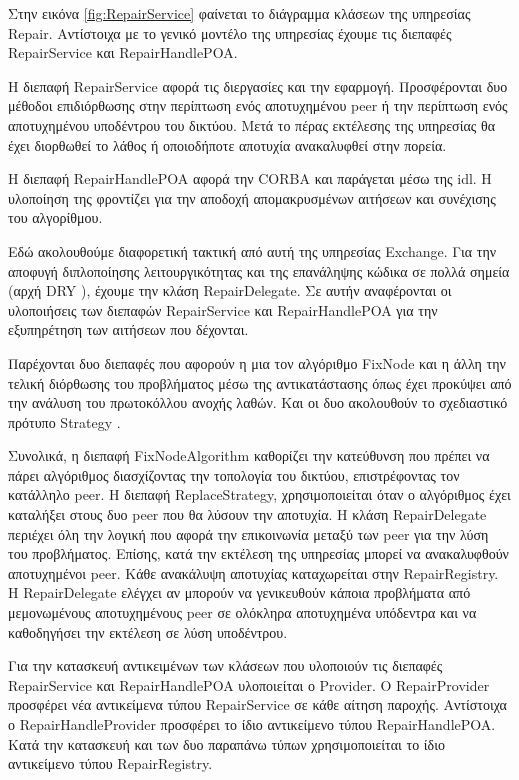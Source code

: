 Στην εικόνα \ref{fig:RepairService} φαίνεται το διάγραμμα κλάσεων της υπηρεσίας 
Repair. Αντίστοιχα με το γενικό μοντέλο της υπηρεσίας έχουμε τις 
διεπαφές RepairService και RepairHandlePOA. 

Η διεπαφή RepairService αφορά τις διεργασίες και την εφαρμογή. 
Προσφέρονται δυο μέθοδοι επιδιόρθωσης στην περίπτωση ενός αποτυχημένου 
peer ή την περίπτωση ενός αποτυχημένου υποδέντρου του δικτύου. Μετά το 
πέρας εκτέλεσης της υπηρεσίας θα έχει διορθωθεί το λάθος ή οποιοδήποτε 
αποτυχία ανακαλυφθεί στην πορεία.

Η διεπαφή RepairHandlePOA αφορά την CORBA και παράγεται μέσω της idl. Η 
υλοποίηση της φροντίζει για την αποδοχή απομακρυσμένων αιτήσεων και 
συνέχισης του αλγορίθμου.

Εδώ ακολουθούμε διαφορετική τακτική από αυτή της υπηρεσίας Exchange. Για 
την αποφυγή διπλοποίησης λειτουργικότητας και της επανάληψης κώδικα σε 
πολλά σημεία (αρχή DRY \citep{Pragmatic1999} ), 
έχουμε την κλάση RepairDelegate. Σε αυτήν αναφέρονται οι υλοποιήσεις των 
διεπαφών RepairService και RepairHandlePOA για την εξυπηρέτηση των 
αιτήσεων που δέχονται. 

Παρέχονται δυο διεπαφές που αφορούν η μια τον αλγόριθμο FixNode και η 
άλλη την τελική διόρθωσης του προβλήματος μέσω της αντικατάστασης όπως 
έχει προκύψει από την ανάλυση του πρωτοκόλλου ανοχής λαθών. Και οι δυο 
ακολουθούν το σχεδιαστικό πρότυπο Strategy \citep{GoF}.

Συνολικά, η διεπαφή FixNodeAlgorithm καθορίζει την κατεύθυνση που πρέπει 
να πάρει αλγόριθμος διασχίζοντας την τοπολογία του δικτύου, 
επιστρέφοντας τον κατάλληλο peer. Η διεπαφή ReplaceStrategy, 
χρησιμοποιείται όταν ο αλγόριθμος έχει καταλήξει στους δυο peer που θα 
λύσουν την αποτυχία. Η κλάση RepairDelegate περιέχει όλη την λογική που 
αφορά την επικοινωνία μεταξύ των peer για την λύση του προβλήματος. 
Επίσης, κατά την εκτέλεση της υπηρεσίας μπορεί να ανακαλυφθούν 
αποτυχημένοι peer. Κάθε ανακάλυψη αποτυχίας καταχωρείται στην 
RepairRegistry. Η RepairDelegate ελέγχει αν μπορούν να γενικευθούν 
κάποια προβλήματα από μεμονωμένους αποτυχημένους peer σε ολόκληρα 
αποτυχημένα υπόδεντρα και να καθοδηγήσει την εκτέλεση σε λύση 
υποδέντρου.

Για την κατασκευή αντικειμένων των κλάσεων που υλοποιούν τις διεπαφές 
RepairService και RepairHandlePOA υλοποιείται ο Provider. Ο RepairProvider 
προσφέρει νέα αντικείμενα τύπου RepairService σε κάθε αίτηση παροχής. 
Αντίστοιχα ο RepairHandleProvider προσφέρει το ίδιο αντικείμενο τύπου 
RepairHandlePOA. Κατά την κατασκευή και των δυο παραπάνω τύπων 
χρησιμοποιείται το ίδιο αντικείμενο τύπου RepairRegistry.

